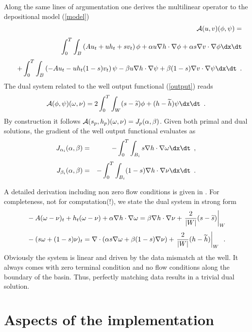 Along the same lines of argumentation one derives the multilinear operator to the depositional model (\ref{model})
\begin{eqnarray*}
 && \displaystyle {\cal A}(u,v)(\phi,\psi) = \\[\jot]
 && \displaystyle \int_0^T \int_B \left(Au_t+uh_t+sv_t\right)\phi + \alpha u \nabla h \cdot \nabla \phi
   + \alpha s \nabla v \cdot \nabla \phi \dx \dt \\[\jot]
 && \displaystyle + \int_0^T \int_B \left(-Au_t-uh_t(1-s)v_t\right)\psi -\beta u \nabla h \cdot \nabla \psi
   + \beta (1-s) \nabla v \cdot \nabla \psi \dx \dt
 \enspace .
\end{eqnarray*}
The dual system related to the well output functional (\ref{output}) reads
$$
 {\cal A}(\phi,\psi)(\omega,\nu) =
  2 \int_0^T \int_W (s - \widetilde s) \phi + (h - \widetilde h) \psi \dx \dt
  \enspace .
$$
By construction it follows ${\cal A}(s_p,h_p)(\omega,\nu) = J_p(\alpha,\beta)$.
Given both primal and dual solutions, the gradient of the well output functional evaluates as
\begin{eqnarray*}
 J_{\alpha_i}(\alpha,\beta) &=&
 - \int_0^T \int_{B_i} s \nabla h \cdot \nabla \omega \dx \dt \enspace , \\[\jot]
 J_{\beta_i}(\alpha,\beta) &=&
 - \int_0^T \int_{B_i} (1-s) \nabla h \cdot \nabla \nu \dx \dt
 \enspace .
\end{eqnarray*}

A detailed derivation including non zero flow conditions is given in \cite{Schroll2008}.
For completeness, not for computation(!), we state the dual system in strong form
\begin{eqnarray*}
 & \displaystyle -A(\omega-\nu)_t + h_t(\omega-\nu) + \alpha \nabla h \cdot \nabla \omega
 = \beta \nabla h \cdot \nabla \nu + \left. \frac{2}{|W|} (s - \widetilde s) \right|_W \\[\jot]
 & \displaystyle -(s\omega + (1-s)\nu)_t
 = \nabla \cdot (\alpha s \nabla \omega + \beta (1-s) \nabla \nu) + \left. \frac{2}{|W|} (h - \widetilde h) \right|_W \enspace .
\end{eqnarray*}
Obviously the system is linear and driven by the data mismatch at the well.
It always comes with zero terminal condition and no flow conditions along the boundary of the basin.
Thus, perfectly matching data results in a trivial dual solution.

\section{Aspects of the implementation}

